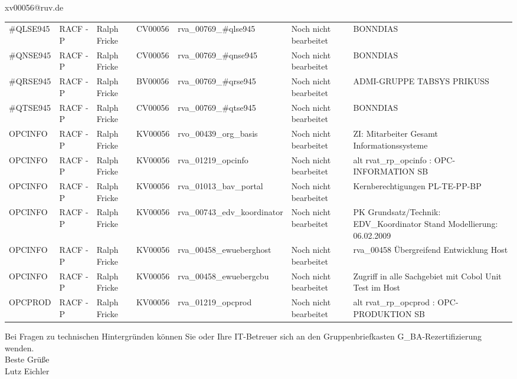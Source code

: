 \documentclass[a4paper,landscape,12pt]{letter}
\begin{document}
\begin{letter}{xv00056@ruv.de\hfill \break}
\begin{tiny}
\begin{longtable}{|p{35mm}|p{15mm}|p{25mm}|p{10mm}|p{40mm}|p{50mm}|p{50mm}|}
\#QLSE945 & RACF - P & Ralph Fricke & CV00056 & rva\_00769\_\#qlse945 & Noch nicht bearbeitet & BONNDIAS \\
\#QNSE945 & RACF - P & Ralph Fricke & CV00056 & rva\_00769\_\#qnse945 & Noch nicht bearbeitet & BONNDIAS \\
\#QRSE945 & RACF - P & Ralph Fricke & BV00056 & rva\_00769\_\#qrse945 & Noch nicht bearbeitet & ADMI-GRUPPE TABSYS PRIKUSS \\
\#QTSE945 & RACF - P & Ralph Fricke & CV00056 & rva\_00769\_\#qtse945 & Noch nicht bearbeitet & BONNDIAS \\
OPCINFO & RACF - P & Ralph Fricke & KV00056 & rvo\_00439\_org\_basis & Noch nicht bearbeitet & ZI: Mitarbeiter Gesamt Informationssysteme \\
OPCINFO & RACF - P & Ralph Fricke & KV00056 & rva\_01219\_opcinfo & Noch nicht bearbeitet & alt rvat\_rp\_opcinfo          : OPC- INFORMATION                         SB \\
OPCINFO & RACF - P & Ralph Fricke & KV00056 & rva\_01013\_bav\_portal & Noch nicht bearbeitet & Kernberechtigungen PL-TE-PP-BP \\
OPCINFO & RACF - P & Ralph Fricke & KV00056 & rva\_00743\_edv\_koordinator & Noch nicht bearbeitet & PK Grundsatz/Technik: EDV\_Koordinator Stand Modellierung: 06.02.2009 \\
OPCINFO & RACF - P & Ralph Fricke & KV00056 & rva\_00458\_ewueberghost & Noch nicht bearbeitet & rva\_00458 Übergreifend Entwicklung Host \\
OPCINFO & RACF - P & Ralph Fricke & KV00056 & rva\_00458\_ewuebergcbu & Noch nicht bearbeitet & Zugriff in alle Sachgebiet mit Cobol Unit Test im Host \\
OPCPROD & RACF - P & Ralph Fricke & KV00056 & rva\_01219\_opcprod & Noch nicht bearbeitet & alt rvat\_rp\_opcprod          : OPC-PRODUKTION                           SB \\

\hline
		\end{longtable}
		\end{tiny}
	
\begin{minipage}{\textwidth}
			Bei Fragen zu technischen Hintergründen können Sie 
			oder Ihre IT-Betreuer sich an den Gruppenbriefkasten 
			G\_BA-Rezertifizierung
			wenden.\\
			\linebreak
			Beste Grüße\\
			Lutz Eichler
	\end{minipage}
	\end{letter}
	
\end{document}
